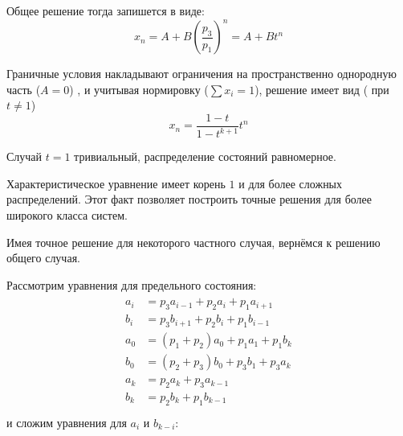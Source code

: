 Общее решение тогда запишется в виде:
   \begin{equation}
    x_n = A + B\left(\frac{p_3}{p_1} \right)^n=A+B t^n
    \end{equation}

Граничные условия накладывают ограничения на пространственно однородную часть ($A=0$) , и учитывая нормировку ($\sum x_i=1$), решение имеет вид ( при $t\neq 1$)
\begin{equation}
\label{sol}
x_n = \frac{1-t}{1-t^{k+1}} t^n
\end{equation}

Случай $t=1$ тривиальный, распределение состояний равномерное.
\begin{zam}
	Характеристическое уравнение имеет корень $1$ и для более сложных распределений. Этот факт позволяет построить точные решения для более широкого класса систем.
\end{zam}

Имея точное решение для некоторого частного случая, вернёмся к решению  общего случая.

Рассмотрим уравнения для предельного состояния:
\begin{align}
\begin{split}
a_i &= p_3 a_{i-1} + p_2 a_i + p_1 a_{i+1}\\
b_i &= p_3 b_{i+1} + p_2 b_i + p_1 b_{i-1}\\
a_0 &= (p_1 + p_2) a_0 + p_1 a_1 + p_1 b_k\\
b_0 &= (p_2 + p_3) b_0 + p_3 b_1 + p_3 a_k \\
a_k &= p_2 a_k + p_3 a_{k-1}\\
b_k &= p_2 b_k + p_1 b_{k-1}\\
\end{split}
\end{align}
и сложим уравнения для $a_i$ и $b_{k-i}$:
\vspace{1cm}

